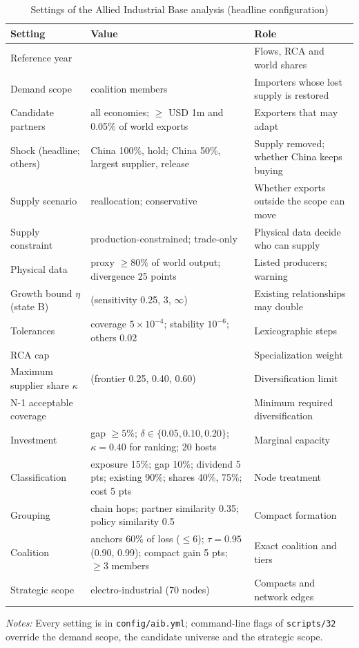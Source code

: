 \begin{table}[htbp]
\centering
\begin{threeparttable}
\caption{Settings of the Allied Industrial Base analysis (headline configuration)}
\label{tab:alg_params}
\footnotesize
\begin{tabularx}{\textwidth}{@{}>{\raggedright\arraybackslash}p{3.4cm}
  >{\raggedright\arraybackslash}p{6.4cm} >{\raggedright\arraybackslash}X@{}}
\toprule
Setting & Value & Role \\
\midrule
Reference year & 2024 & Flows, RCA and world shares \\
Demand scope & 57 coalition members & Importers whose lost supply is restored \\
Candidate partners & all economies; $\ge$ USD 1m and 0.05\% of world exports & Exporters that may adapt \\
Shock (headline; others) & China 100\%, hold; China 50\%, largest supplier, release & Supply removed; whether China keeps buying \\
Supply scenario & reallocation; conservative & Whether exports outside the scope can move \\
Supply constraint & production-constrained; trade-only & Physical data decide who can supply \\
Physical data & proxy $\ge80\%$ of world output; divergence 25 points & Listed producers; warning \\
Growth bound $\eta$ (state B) & 1 (sensitivity 0.25, 3, $\infty$) & Existing relationships may double \\
Tolerances & coverage $5\times10^{-4}$; stability $10^{-6}$; others 0.02 & Lexicographic steps \\
RCA cap & 4 & Specialization weight \\
Maximum supplier share $\kappa$ & 1 (frontier 0.25, 0.40, 0.60) & Diversification limit \\
N-1 acceptable coverage & 0.80 & Minimum required diversification \\
Investment & gap $\ge5\%$; $\delta\in\{0.05,0.10,0.20\}$; $\kappa=0.40$ for ranking; 20 hosts & Marginal capacity \\
Classification & exposure 15\%; gap 10\%; dividend 5 pts; existing 90\%; shares 40\%, 75\%; cost 5 pts & Node treatment \\
Grouping & 3 chain hops; partner similarity 0.35; policy similarity 0.5 & Compact formation \\
Coalition & anchors 60\% of loss ($\le6$); $\tau=0.95$ (0.90, 0.99); compact gain 5 pts; $\ge3$ members & Exact coalition and tiers \\
Strategic scope & electro-industrial (70 nodes) & Compacts and network edges \\
\bottomrule
\end{tabularx}
\begin{tablenotes}[flushleft]\footnotesize
\item \textit{Notes:} Every setting is in \texttt{config/aib.yml}; command-line flags of
\texttt{scripts/32} override the demand scope, the candidate universe and the strategic scope.
\end{tablenotes}
\end{threeparttable}
\end{table}
